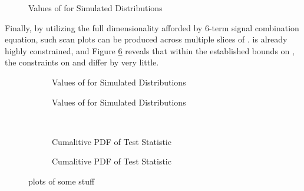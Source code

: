     \begin{figure} %
         
        \caption{Values of \qtil for Simulated Distributions}
        \label{fig:kvv_kl_2Dscan}
    \end{figure}

    Finally, by utilizing the full dimensionality afforded by 6-term signal combination equation,
        such scan plots can be produced across multiple slices of \kv.
    \kv is already highly constrained, and Figure \ref{fig:kvv_kl_multislice}
        reveals that within the established bounds on \kv,
        the constraints on \kl and \kvv differ by very little.

    \begin{figure} %
        \centering
        \begin{subfigure}{0.4\textwidth} 
             
            \caption{Values of \qtil for Simulated Distributions}
            \label{fig:kvv_kl_2Dscan_kv0.96}
        \end{subfigure}
        \begin{subfigure}{0.4\textwidth} 
             
            \caption{Values of \qtil for Simulated Distributions}
            \label{fig:kvv_kl_2Dscan_kv1}
        \end{subfigure} \\
        \begin{subfigure}{0.4\textwidth}
             
            \caption{Cumalitive PDF of \qtil Test Statistic}
            \label{fig:kvv_kl_2Dscan_kv1.03}
        \end{subfigure}
        \begin{subfigure}{0.4\textwidth}
             
            \caption{Cumalitive PDF of \qtil Test Statistic}
            \label{fig:kvv_kl_2Dscan_kv1.06}
        \end{subfigure}
        \caption{
            plots of some stuff
        }\label{fig:kvv_kl_multislice}
    \end{figure}
